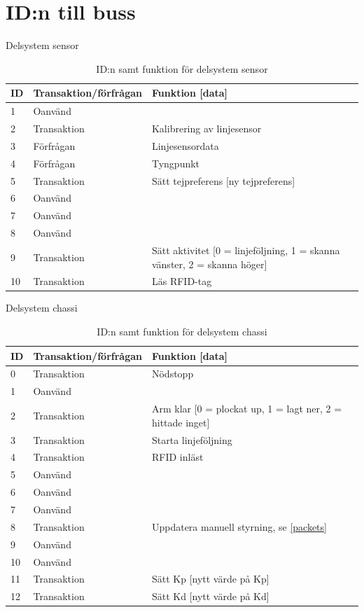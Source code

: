 \section{ID:n till buss}
\label{callbacks}

\begin{table}[H]
\centering
\label{callbacks-sensor}
Delsystem sensor
\begin{tabularx}{\textwidth}{|l|l|X|}
\hline
\textbf{ID} & \textbf{Transaktion/förfrågan} & \textbf{Funktion [data]} \\ \hline
1 & Oanvänd & \\ \hline
2 & Transaktion & Kalibrering av linjesensor \\ \hline
3 & Förfrågan & Linjesensordata \\ \hline
4 & Förfrågan & Tyngpunkt \\ \hline
5 & Transaktion & Sätt tejpreferens [ny tejpreferens] \\ \hline
6 & Oanvänd & \\ \hline
7 & Oanvänd & \\ \hline
8 & Oanvänd & \\ \hline
9 & Transaktion & Sätt aktivitet [0 = linjeföljning, 1 = skanna vänster, 2 = skanna höger] \\ \hline
10 & Transaktion & Läs RFID-tag \\ \hline
\end{tabularx}
\caption{ID:n samt funktion för delsystem sensor}
\end{table}

Delsystem chassi

\begin{table}[H]
\centering
\label{callbacks-chassi}
\begin{tabularx}{\textwidth}{|l|l|X|}
\hline
\textbf{ID} & \textbf{Transaktion/förfrågan} & \textbf{Funktion [data]} \\ \hline
0 & Transaktion & Nödstopp \\ \hline
1 & Oanvänd & \\ \hline
2 & Transaktion & Arm klar [0 = plockat up, 1 = lagt ner, 2 = hittade inget] \\ \hline
3 & Transaktion & Starta linjeföljning \\ \hline
4 & Transaktion & RFID inläst \\ \hline
5 & Oanvänd & \\ \hline
6 & Oanvänd & \\ \hline
7 & Oanvänd & \\ \hline
8 & Transaktion & Uppdatera manuell styrning, se \ref{packets}\\ \hline
9 & Oanvänd & \\ \hline
10 & Oanvänd & \\ \hline
11 & Transaktion & Sätt Kp [nytt värde på Kp] \\ \hline
12 & Transaktion & Sätt Kd [nytt värde på Kd] \\ \hline
\end{tabularx}
\caption{ID:n samt funktion för delsystem chassi}
\end{table}

